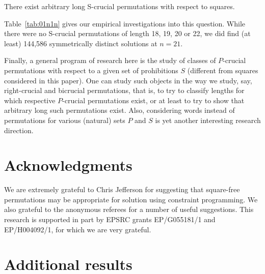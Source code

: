 \documentclass[12pt,reqno]{article}
\begin{document}
\begin{conjecture}\label{long-S-crucial} There exist arbitrary long S-crucial permutations with respect to squares. \end{conjecture}

Table~\ref{tab:01n1n} gives our empirical investigations into this question.   While there were no S-crucial permutations of length 18, 19, 20 or 22, we did find (at least) 144,586 symmetrically distinct solutions at $n=21$.   


Finally, a general program of research here is the study of classes of $P$-crucial permutations with respect to a given set of prohibitions $S$ (different from squares considered in this paper). One can study such objects in the way we study, say, right-crucial and bicrucial permutations, that is, to try to classify lengths for which respective $P$-crucial permutations exist, or at least to try to show that arbitrary long such permutations exist. Also, considering words instead of permutations for various (natural) sets $P$ and $S$ is yet another interesting research direction. 

\section{Acknowledgments}

We are extremely grateful to Chris Jefferson for suggesting that square-free permutations may be appropriate for solution using constraint programming.  We also grateful to the anonymous referees for a number of useful suggestions. This research is supported in part by EPSRC grants EP/G055181/1 and EP/H004092/1, for which we are very grateful.

\appendix

\section{Additional results}
\end{document}

